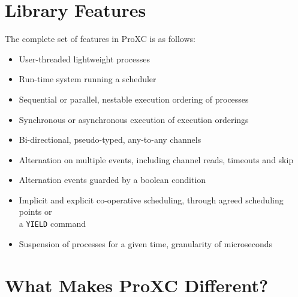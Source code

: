 \section{Library Features}
\label{sec:proxc_features}

The complete set of features in ProXC is as follows:
\begin{itemize}
    \setlength\itemsep{0em}
    \item User\hyp{}threaded lightweight processes
    \item Run\hyp{}time system running a scheduler
    \item Sequential or parallel, nestable execution ordering of processes
    \item Synchronous or asynchronous execution of execution orderings
    \item Bi\hyp{}directional, pseudo\hyp{}typed, any\hyp{}to\hyp{}any channels
    \item Alternation on multiple events, including channel reads, timeouts and skip
    \item Alternation events guarded by a boolean condition
    \item Implicit and explicit co\hyp{}operative scheduling, through agreed scheduling points or\\ a \texttt{YIELD} command
    \item Suspension of processes for a given time, granularity of microseconds
\end{itemize}

\section{What Makes ProXC Different?}
\label{sec:proxc_difference}



